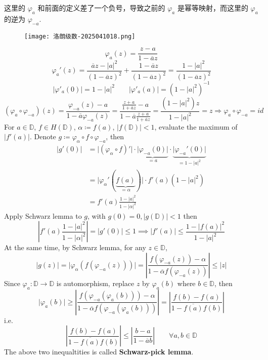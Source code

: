 \begin{remark}
这里的 $\varphi_{a}$ 和前面的定义差了一个负号，导致之前的 $\varphi_{a}$ 是幂等映射，而这里的 $\varphi_{a}$ 的逆为 $\varphi_{-a}$.
\end{remark}
\begin{figure}[H]
\centering
\texttt{[image: 洛朗级数-2025041018.png]}
\label{}
\end{figure}
\[
\varphi_{a}(z)=\frac{z-a}{1-\overline{a}z}
\]
\[
\varphi_{a}'(z)=\frac{\overline{a}z-\lvert a \rvert ^2}{(1-\overline{a}z)^2}+\frac{1-\overline{a}z}{(1-\overline{a}z)^2} =\frac{1-\lvert a \rvert ^2}{(1-\overline{a}z)^2}
\]
\[
\lvert \varphi'_{a}(0) \rvert =1-\lvert a \rvert ^2\qquad \lvert \varphi'_{a}(a) \rvert =(1-\lvert a \rvert ^2)^{-1}
\]
\[
(\varphi _{a}\circ \varphi_{-a})(z)=\frac{\varphi_{-a}(z)-a}{1-\overline{a}\varphi_{-a}(z)}=\frac{\frac{z+a}{1+\overline{a}z}-a}{1-\overline{a}\frac{z+a}{1+\overline{a}z}}=\frac{(1-\lvert a \rvert ^2)z}{1-\lvert a \rvert ^2}=z\Rightarrow\varphi_{a}\circ \varphi_{-a}=id
\]
For $a\in \mathbb{D}$, $f\in H(\mathbb{D})$, $\alpha\coloneqq f(a)$, $\lvert f(\mathbb{D}) \rvert<1$, evaluate the maximum of $\lvert f'(a) \rvert$. Denote $g\coloneqq\varphi_{\alpha}\circ f\circ\varphi_{-a}$, then
\[
\begin{aligned}
\lvert g'(0) \rvert  & =\lvert (\varphi_{\alpha}\circ f)' \rvert \cdot\underbrace{ \lvert \varphi_{-a}(0) \rvert  }_{ =a }\cdot\underbrace{ \lvert \varphi_{-a}'(0) \rvert  }_{ =1-\lvert a \rvert ^2 } \\
 & =\lvert \varphi_{\alpha}'(\underbrace{ f(a) }_{ =\alpha }) \rvert \cdot f'(a)(1-\lvert a \rvert ^2) \\
 & =f'(a)\frac{1-\lvert a \rvert ^2}{1-\lvert \alpha \rvert ^2}
\end{aligned}
\]
Apply Schwarz lemma to $g$, with $g (0)=0, \lvert g(\mathbb{D}) \rvert< 1$ then
\[
\left\lvert  f'(a)\frac{1-\lvert a \rvert ^2}{1-\lvert \alpha \rvert ^2}  \right\rvert = \lvert g'(0) \rvert  \leq 1\implies \lvert f'(a) \rvert \leq \frac{1-\lvert f(a) \rvert ^2}{1-\lvert a \rvert ^2}
\]
At the same time, by Schwarz lemma, for any $z\in \mathbb{D}$,
\[
\lvert g(z) \rvert =\lvert \varphi_{\alpha}(f(\varphi_{-a}(z))) \rvert =\left\lvert  \frac{f(\varphi_{-a}(z))-\alpha}{1-\overline{\alpha}f(\varphi_{-a}(z))}  \right\rvert\leq \lvert z \rvert 
\]
Since $\varphi_{a}:\mathbb{D}\to \mathbb{D}$ is automorphism, replace $z$ by $\varphi_{a}(b)$ where $b\in \mathbb{D}$, then
\[
\lvert \varphi_{a}(b) \rvert \geq \left\lvert  \frac{f(\varphi_{-a}(\varphi_{a}(b)))-\alpha}{1-\overline{\alpha}f(\varphi_{-a}(\varphi_{a}(b)))}  \right\rvert =\left\lvert  \frac{f(b)-f(a)}{1-\overline{f(a)}f(b)}  \right\rvert 
\]
i.e.
\[
\left\lvert  \frac{f(b)-f(a)}{1-\overline{f(a)}f(b)}  \right\rvert \leq \left\lvert  \frac{b-a}{1-\overline{a}b}  \right\rvert \qquad \forall a,b\in \mathbb{D}
\]
The above two inequaltities is called \textbf{Schwarz-pick lemma}.

